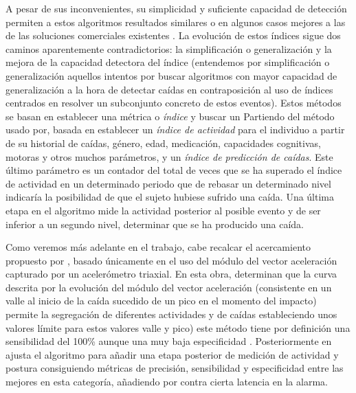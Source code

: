 A pesar de sus inconvenientes, su simplicidad y suficiente capacidad de detección permiten a estos algoritmos resultados similares o en algunos casos mejores a las de las soluciones comerciales existentes \cite{Kangas2008}. La evolución de estos índices sigue dos caminos aparentemente contradictorios: la simplificación o generalización y la mejora de la capacidad detectora del índice (entendemos por simplificación o generalización aquellos intentos por buscar algoritmos con mayor capacidad de generalización a la hora de detectar caídas en contraposición al uso de índices centrados en resolver un subconjunto concreto de estos eventos). Estos métodos se basan en establecer una métrica o \textit{índice} y buscar un  Partiendo del método usado por, basada en establecer un \textit{índice de actividad} para el individuo a partir de su historial de caídas, género, edad, medicación, capacidades cognitivas, motoras y otros muchos parámetros, y un \textit{índice de predicción de caídas}. Este último parámetro es un contador del total de veces que se ha superado el índice de actividad en un determinado periodo que de rebasar un determinado nivel indicaría la posibilidad de que el sujeto hubiese sufrido una caída. Una última etapa en el algoritmo mide la actividad posterior al posible evento y de ser inferior a un segundo nivel, determinar que se ha producido una caída. 

Como veremos más adelante en el trabajo, cabe recalcar el acercamiento propuesto por , basado únicamente en el uso del módulo del vector aceleración capturado por un acelerómetro triaxial. En esta obra,  determinan que la curva descrita por la evolución del módulo del vector aceleración (consistente en un valle al inicio de la caída sucedido de un pico en el momento del impacto) permite la segregación de diferentes actividades y de caídas estableciendo unos valores límite para estos valores valle y pico) este método tiene por definición una sensibilidad del 100\% aunque una muy baja especificidad \cite{Aziz2017,Bagala2012}. Posteriormente en  ajusta el algoritmo para añadir una etapa posterior de medición de actividad y postura consiguiendo métricas de precisión, sensibilidad y especificidad entre las mejores en esta categoría, añadiendo por contra cierta latencia en la alarma.


